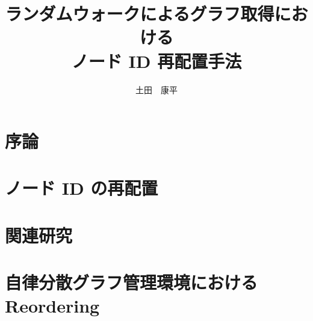 \documentclass[12pt]{b-thesis}
\begin{document}
\title{ランダムウォークによるグラフ取得における\\ノード ID 再配置手法}
\titleinenglish{}
\subteacher{}
\courseinenglish{}
\author{土田　康平}
\maketitle

\courseinenglish{}
\authorinenglish{}
\titleinenglish{}



\makejabstract

\clearpage


\setcounter{page}{1}

\tableofcontents
\thispagestyle{plain}

\listoffigures
\listoftables

\clearpage


\pagestyle{headings}
\setcounter{page}{1}

\clearpage

\chapter{序論}
\label{chap:introduction}


\chapter{ノード ID の再配置}
\label{chap:existing_technology}


\chapter{関連研究}
\label{chap:related_research}


\chapter{自律分散グラフ管理環境における Reordering}
\label{chap:design}


\begin{comment}
\chapter{プロトコル詳細}
\label{chap:protocol}

\end{comment}
\end{document}
